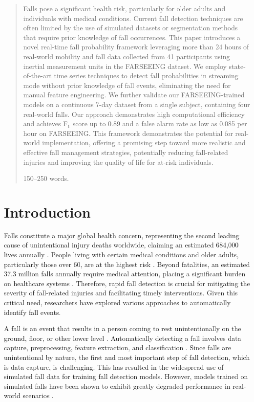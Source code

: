 \documentclass[runningheads]{llncs}
\begin{document}
\begin{abstract}
Falls pose a significant health risk, particularly for older adults and individuals with medical conditions. Current fall detection techniques are often limited by the use of simulated datasets or segmentation methods that require prior knowledge of fall occurrences. This paper introduces a novel real-time fall probability framework leveraging more than 24 hours of real-world mobility and fall data collected from 41 participants using inertial measurement units in the FARSEEING dataset. We employ state-of-the-art time series techniques to detect fall probabilities in streaming mode without prior knowledge of fall events, eliminating the need for manual feature engineering. We further validate our FARSEEING-trained models on a continuous 7-day dataset from a single subject, containing four real-world falls. Our approach demonstrates high computational efficiency and achieves F$_1$ score up to 0.89 and a false alarm rate as low as 0.085 per hour on FARSEEING. This framework demonstrates the potential for real-world implementation, offering a promising step toward more realistic and effective fall management strategies, potentially reducing fall-related injuries and improving the quality of life for at-risk individuals.

150--250 words.

\end{abstract}

\section{Introduction}
Falls constitute a major global health concern, representing the second leading cause of unintentional injury deaths worldwide, claiming an estimated 684,000 lives annually \cite{step_safely_2021}. People living with certain medical conditions and older adults, particularly those over 60, are at the highest risk \cite{vaishya2020falls}. Beyond fatalities, an estimated 37.3 million falls annually require medical attention, placing a significant burden on healthcare systems \cite{camp2024integrating}. Therefore, rapid fall detection is crucial for mitigating the severity of fall-related injuries and facilitating timely interventions. Given this critical need, researchers have explored various approaches to automatically identify fall events.

A fall is an event that results in a person coming to rest unintentionally on the ground, floor, or other lower level \cite{step_safely_2021}. Automatically detecting a fall involves data capture, preprocessing, feature extraction, and classification \cite{liu2023review}. Since falls are unintentional by nature, the first and most important step of fall detection, which is data capture, is challenging. This has resulted in the widespread use of simulated fall data for training fall detection models. However, models trained on simulated falls have been shown to exhibit greatly degraded performance in real-world scenarios \cite{aderinola2024accurate}.
\end{document}

